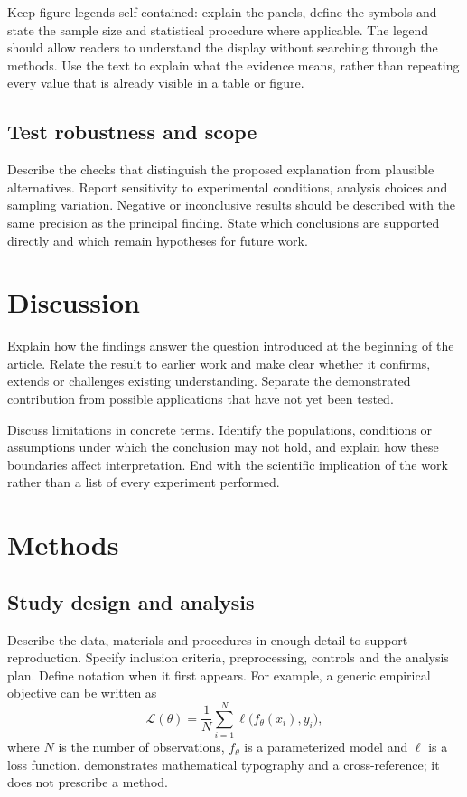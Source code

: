 Keep figure legends self-contained: explain the panels, define the symbols and
state the sample size and statistical procedure where applicable. The legend
should allow readers to understand the display without searching through the
methods. Use the text to explain what the evidence means, rather than repeating
every value that is already visible in a table or figure.

\subsection{Test robustness and scope}
Describe the checks that distinguish the proposed explanation from plausible
alternatives. Report sensitivity to experimental conditions, analysis choices
and sampling variation. Negative or inconclusive results should be described
with the same precision as the principal finding. State which conclusions are
supported directly and which remain hypotheses for future work.

\section{Discussion}
Explain how the findings answer the question introduced at the beginning of the
article. Relate the result to earlier work and make clear whether it confirms,
extends or challenges existing understanding. Separate the demonstrated
contribution from possible applications that have not yet been tested.

Discuss limitations in concrete terms. Identify the populations, conditions or
assumptions under which the conclusion may not hold, and explain how these
boundaries affect interpretation. End with the scientific implication of the
work rather than a list of every experiment performed.

\section{Methods}
\subsection{Study design and analysis}
Describe the data, materials and procedures in enough detail to support
reproduction. Specify inclusion criteria, preprocessing, controls and the
analysis plan. Define notation when it first appears. For example, a generic
empirical objective can be written as
\begin{equation}
  \mathcal{L}(\theta)=\frac{1}{N}\sum_{i=1}^{N}
  \ell\bigl(f_{\theta}(x_i),y_i\bigr),
  \label{eq:objective}
\end{equation}
where $N$ is the number of observations, $f_{\theta}$ is a parameterized model
and $\ell$ is a loss function.  demonstrates
mathematical typography and a cross-reference; it does not prescribe a method.


